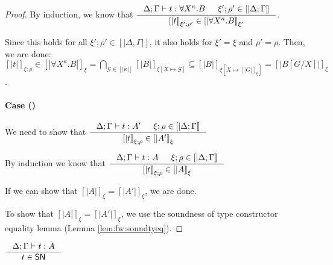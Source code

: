 \begin{proof}
By induction, we know that
$ \inference
	{ \Delta;\Gamma |- t : \forall X^\kappa.B
	& \xi';\rho'\in[|\Delta;\Gamma|] }
	{[|t|]_{\xi';\rho'} \in [|\forall X^\kappa.B|]_{\xi'}} $.

Since this holds for all $\xi';\rho' \in [|\Delta,\Gamma|]$,
it also holds for $\xi'=\xi$ and $\rho'=\rho$. Then, we are done:
$ [|t|]_{\xi;\rho} \in [|\forall X^\kappa.B|]_{\xi}
	= \bigcap_{\mathcal{G}\in[|\kappa|]} [|B|]_{\xi[X\mapsto\mathcal{G}]}
	\subseteq [|B|]_{\xi[X\mapsto[|G|]_\xi]} = [|B[G/X]|]_\xi $.

\paragraph{Case ()}
We need to show that
$ \inference{\Delta;\Gamma |- t : A' & \xi;\rho\in[|\Delta;\Gamma|]}
	{[|t|]_{\xi;\rho} \in [|A'|]_\xi} $

By induction we know that 
$ \inference{\Delta;\Gamma |- t : A & \xi;\rho\in[|\Delta;\Gamma|]}
	{[|t|]_{\xi;\rho} \in [|A|]_\xi} $

If we can show that $[|A|]_\xi = [|A'|]_\xi$, we are done.

To show that $[|A|]_\xi = [|A'|]_\xi$,
we use the soundness of type constructor equality lemma
(Lemma \ref{lem:fw:soundtyeq}).
\end{proof}

\begin{corollary}
	$\inference{\Delta;\Gamma |- t : A}{t \in \SN}$
\end{corollary}

